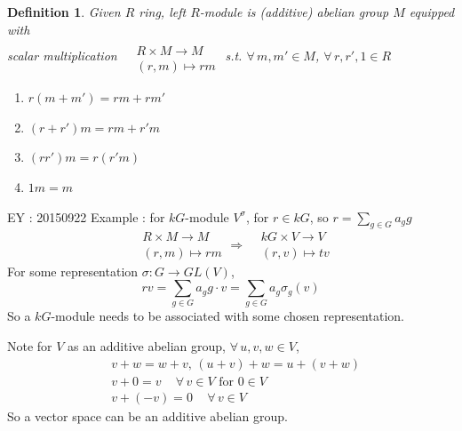 \documentclass[10pt]{amsart}
\newtheorem{definition}{Definition}
\begin{document}
\begin{multicols*}{2}
\begin{enumerate}
\end{enumerate}

\begin{definition}
	Given $R$ ring, left $R$-module is (additive) abelian group $M$ equipped with \\
	scalar multiplication $\begin{aligned} & \quad \\
	& R \times M \to M \\
	& (r,m) \mapsto rm \end{aligned}$ s.t. $\forall \, m , m' \in M$, $\forall \, r, r' , 1 \in R$
	\begin{enumerate}
		\item[(i)] $r (m+m') = rm + rm' $ 
		\item[(ii)] $(r+r')m = rm + r'm $ 
		\item[(iii)] $(rr')m = r(r'm)$
		\item[(iv)] $1m = m$
	\end{enumerate}
\end{definition}

EY : 20150922 Example : for $kG$-module $V^{\sigma}$, for $r \in kG$, so $r= \sum_{g\in G} a_g g$ 
\[
\begin{aligned} & R \times M \to M \\
& (r,m) \mapsto rm \end{aligned} \Longrightarrow \begin{aligned} & kG \times V \to V \\
& (r,v) \mapsto tv \end{aligned}
\]
For some representation $\sigma : G \to GL(V)$, 
\[
rv = \sum_{g \in G} a_g g \cdot v =\sum_{g\in G} a_g \sigma_g(v)
\]
So a $kG$-module needs to be associated with some chosen representation.  

Note for $V$ as an additive abelian group, $\forall \, u,v,w \in V$, 
\[
\begin{aligned}
& v+w = w+v, \, (u+v) + w = u+(v+w) \\ 
& v+0 = v \quad \, \forall \, v \in V \text{ for } 0 \in V \\ 
& v+ (-v) =0 \quad \, \forall \, v \in V
\end{aligned}
\]
So a vector space can be an additive abelian group.  


\end{multicols*}
\end{document}
